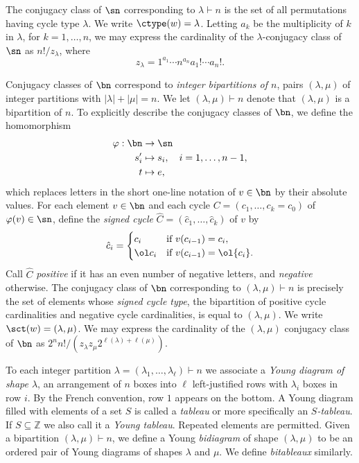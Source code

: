 The conjugacy class of $\sn$ corresponding to $\lambda \vdash n$
is the set of all permutations having cycle type $\lambda$.  We write
$\ctype(w) = \lambda$. Letting
$a_k$ be the multiplicity of $k$ in $\lambda$, for $k =1,\dotsc,n$,
we may express the cardinality of the $\lambda$-conjugacy class of $\sn$ as
$n!/z_\lambda$, where
\begin{equation}\label{eq:zlambda}
 z_\lambda = {1^{a_1} \cdots n^{a_n} a_1! \cdots a_n!}.
\end{equation}

Conjugacy classes of $\bn$ correspond to
{\em integer bipartitions of $n$}, pairs $(\lambda,\mu)$
of integer partitions with 
$|\lambda| + |\mu| = n$.
We let
$(\lambda,\mu) \vdash n$ denote that $(\lambda,\mu)$ is
a bipartition of $n$. 
To explicitly describe the conjugacy classes of $\bn$,
we define the homomorphism
\begin{equation}\label{eq:varphi}
  \begin{aligned}
    \varphi: \bn &\rightarrow \sn \\
    s'_i &\mapsto s_i, \quad i=1,\dotsc,n-1,\\
    t &\mapsto e,
  \end{aligned}
  \end{equation}
which replaces letters in the short one-line notation of
$v \in \bn$ by their absolute values.
For each element $v \in \bn$
and each cycle $C = (c_1, \dotsc, c_k = c_0)$
of $\varphi(v) \in \sn$,
define the {\em signed cycle}
$\hat C = (\hat c_1, \dotsc, \hat c_k)$
of $v$ by
\begin{equation*}
  \hat c_i = \begin{cases}
  c_i &\text{if $v(c_{i-1}) = c_i$},\\
  \ol c_i &\text{if $v(c_{i-1}) = \ol{c_i}$}.
  \end{cases}
\end{equation*}
Call $\hat C$ {\em positive} if it has an even number of negative letters,
and {\em negative} otherwise.
The conjugacy class of $\bn$ corresponding to $(\lambda,\mu) \vdash n$
is precisely the set of elements  
whose {\em signed cycle type}, the bipartition of
positive cycle cardinalities and negative cycle cardinalities,
is equal to $(\lambda,\mu)$.
We write $\sct(w) = (\lambda,\mu)$.
We may express the cardinality of the $(\lambda,\mu)$
conjugacy class of $\bn$ as $2^nn!/(z_\lambda z_\mu 2^{\ell(\lambda) + \ell(\mu)})$.
  

To each integer partition
$\lambda = (\lambda_1, \dotsc, \lambda_\ell) \vdash n$
we associate a {\em Young diagram of shape $\lambda$},
an arrangement of $n$ boxes into $\ell$ left-justified rows
with $\lambda_i$ boxes in row $i$.  By the French convention, row $1$ appears
on the bottom.
A Young diagram filled with
elements of a set $S$ is called a {\em tableau} or more specifically an
{\em $S$-tableau}.  If $S \subseteq \mathbb Z$ we also call it a
{\em Young tableau}.
Repeated elements are permitted.
Given a bipartition $(\lambda,\mu) \vdash n$, we define
a Young {\em bidiagram} of shape $(\lambda,\mu)$
to be an ordered pair of Young diagrams of shapes $\lambda$ and $\mu$.
We define {\em bitableaux} similarly.


